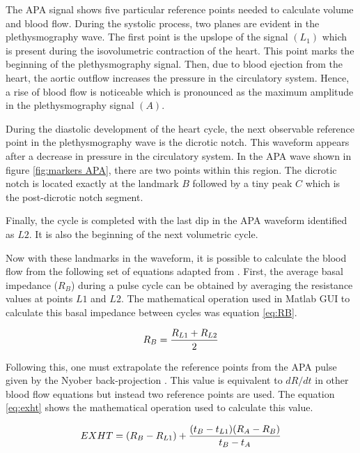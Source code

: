 The APA signal shows five particular reference points needed to calculate volume and blood flow. During the systolic process, two planes are evident in the plethysmography wave. The first point is the upslope of the signal $(L_{1})$ which is present during the isovolumetric contraction of the heart. This point marks the beginning of the plethysmography signal. Then, due to blood ejection from the heart, the aortic outflow increases the pressure in the circulatory system. Hence, a rise of blood flow is noticeable which is pronounced as the maximum amplitude in the plethysmography signal $(A)$. 

During the diastolic development of the heart cycle, the next observable reference point in the plethysmography wave is the dicrotic notch. This waveform appears after a decrease in pressure in the circulatory system. In the APA wave shown in figure \ref{fig:markers APA}, there are two points within this region. The dicrotic notch is located exactly at the landmark $B$ followed by a tiny peak $C$ which is the post-dicrotic notch segment. 

Finally, the cycle is completed with the last dip in the APA waveform identified as $L2$. It is also the beginning of the next volumetric cycle. 

Now with these landmarks in the waveform, it is possible to calculate the blood flow from the following set of equations adapted from \cite{montgomery2011segmental}. First, the average basal impedance ($R_B$) during a pulse cycle can be obtained by averaging the resistance values at points $L1$ and $L2$. The mathematical operation used in Matlab GUI to calculate this basal impedance between cycles was equation \ref{eq:RB}.


\begin{align}
	\label{eq:RB}
	R_B = \frac{R_{L1}+R_{L2}}{2} \tagaddtext{[\si{\Omega}]}
\end{align}

Following this, one must extrapolate the reference points from the APA pulse given by the Nyober back-projection \cite{montgomery2011segmental}. This value is equivalent to $dR/dt$ in other blood flow equations but instead two reference points are used. The equation \ref{eq:exht} shows the mathematical operation used to calculate this value.

\begin{align}
	\label{eq:exht}
	EXHT = (R_{B}-R_{L1}) + \frac{(t_{B}-t_{L1})(R_{A}-R_{B})}{t_{B}-t_{A}} \tagaddtext{[\si{\Omega}]}
\end{align}

